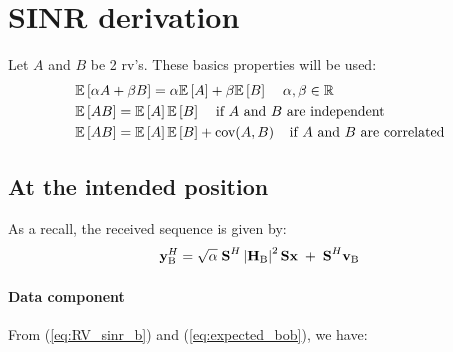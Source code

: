 \renewcommand{\theparagraph}{A}

\section{SINR derivation}\label{appA:SINR_deriv}
Let $A$ and $B$ be 2 \gls{rv}'s. These basics properties will be used:
\begin{equation}
    \begin{split}
        &\mathbb{E} \left[\alpha A + \beta B\right] = \alpha \mathbb{E} \left[A\right] + \beta \mathbb{E} \left[B\right] \; \;\; \;\alpha,\beta\in\mathbb{R} \\
        &\mathbb{E} \left[AB\right] = \mathbb{E} \left[A\right] \mathbb{E} \left[B\right] \; \;\; \; \text{if $A$ and $B$ are independent} \\
        &\mathbb{E} \left[AB\right] = \mathbb{E} \left[A\right] \mathbb{E} \left[B\right] + \text{cov}(A,B)\; \; \; \;\text{if $A$ and $B$ are correlated}
    \end{split} 
\end{equation}
\subsection{At the intended position}
As a recall, the received sequence is given by:
\begin{equation}
    \textbf{y}_{\text{B}}^H = \sqrt{\alpha} \; \textbf{S}^H \left|\textbf{H}_{\text{B}}\right|^2 \textbf{S} \textbf{x} \;  +  \;  \textbf{S}^H \textbf{v}_\text{B} 
    \label{eq:app:rx_bob_AN}
\end{equation}

\paragraph*{Data component}
From (\ref{eq:RV_sinr_b}) and (\ref{eq:expected_bob}), we have:

